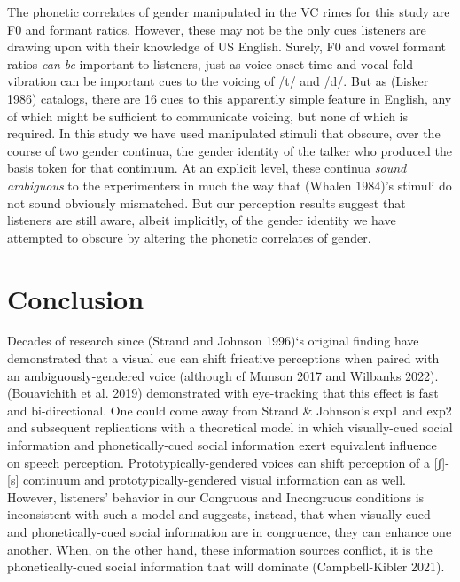 \documentclass[
  letterpaper,
  DIV=11,
  numbers=noendperiod]{scrartcl}
\begin{document}
The phonetic correlates of gender manipulated in the VC rimes for this
study are F0 and formant ratios. However, these may not be the only cues
listeners are drawing upon with their knowledge of US English. Surely,
F0 and vowel formant ratios \emph{can be} important to listeners, just
as voice onset time and vocal fold vibration can be important cues to
the voicing of /t/ and /d/. But as (Lisker 1986) catalogs, there are 16
cues to this apparently simple feature in English, any of which might be
sufficient to communicate voicing, but none of which is required. In
this study we have used manipulated stimuli that obscure, over the
course of two gender continua, the gender identity of the talker who
produced the basis token for that continuum. At an explicit level, these
continua \emph{sound ambiguous} to the experimenters in much the way
that (Whalen 1984)'s stimuli do not sound obviously mismatched. But our
perception results suggest that listeners are still aware, albeit
implicitly, of the gender identity we have attempted to obscure by
altering the phonetic correlates of gender.

\section{Conclusion}\label{conclusion}

Decades of research since (Strand and Johnson 1996)`s original finding
have demonstrated that a visual cue can shift fricative perceptions when
paired with an ambiguously-gendered voice (although cf Munson 2017 and
Wilbanks 2022). (Bouavichith et al. 2019) demonstrated with eye-tracking
that this effect is fast and bi-directional. One could come away from
Strand \& Johnson's exp1 and exp2 and subsequent replications with a
theoretical model in which visually-cued social information and
phonetically-cued social information exert equivalent influence on
speech perception. Prototypically-gendered voices can shift perception
of a {[}ʃ{]}-{[}s{]} continuum and prototypically-gendered visual
information can as well. However, listeners' behavior in our Congruous
and Incongruous conditions is inconsistent with such a model and
suggests, instead, that when visually-cued and phonetically-cued social
information are in congruence, they can enhance one another. When, on
the other hand, these information sources conflict, it is the
phonetically-cued social information that will dominate (Campbell-Kibler
2021).
\end{document}
